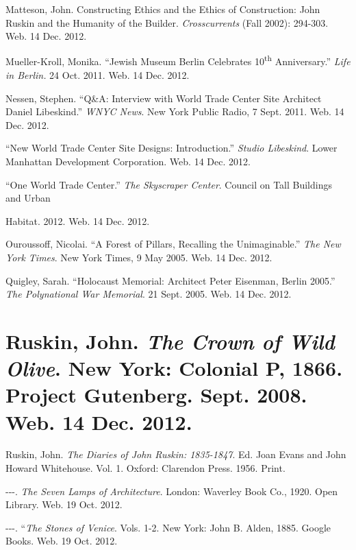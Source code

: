 {\color{black}
Matteson, John.  {\textquotedbl}Constructing Ethics and the Ethics of
Construction: John Ruskin and the Humanity of the
Builder.{\textquotedbl}  \textit{Crosscurrents} (Fall 2002): 294-303. 
Web.  14 Dec. 2012.}

{\color{black}
Mueller-Kroll, Monika.  “Jewish Museum Berlin Celebrates
10\textsuperscript{th} Anniversary.”  \textit{Life in Berlin.}  24 Oct.
2011.  Web.  14 Dec. 2012.  }

{\color{black}
Nessen, Stephen.  “Q\&A: Interview with World Trade Center Site
Architect Daniel Libeskind.”  \textit{WNYC News}.  New York Public
Radio, 7 Sept. 2011.  Web.  14 Dec. 2012.  }

{\color{black}
“New World Trade Center Site Designs: Introduction.”  \textit{Studio
Libeskind}.  Lower Manhattan Development Corporation.  Web.  14 Dec.
2012.  }

“One World Trade Center.”  \textit{The Skyscraper Center}.  Council on
Tall Buildings and Urban 

Habitat.  2012.  Web. 14 Dec. 2012.  

{\color{black}
Ouroussoff, Nicolai.  “A Forest of Pillars, Recalling the Unimaginable.”
 \textit{The New York Times}. New York Times, 9 May 2005.  Web.  14
Dec. 2012.}

{\color{black}
Quigley, Sarah.  “Holocaust Memorial: Architect Peter Eisenman, Berlin
2005.”  \textit{The Polynational War Memorial}.  21 Sept.  2005.  Web. 
14 Dec. 2012.  }

\section[Ruskin, John. \ The Crown of Wild Olive. \ New York: Colonial
P, 1866. \ Project Gutenberg. \ Sept. 2008. \ Web. \ 14 Dec. 2012.
]{\textmd{Ruskin, John.  }\textmd{\textit{The Crown of Wild
Olive}}\textmd{.  New York: Colonial P, 1866.  Project Gutenberg. 
Sept. 2008.  Web.  14 Dec. 2012. }}
{\color{black}
Ruskin, John.  \textit{The Diaries of John Ruskin: 1835-1847}.  Ed. 
Joan Evans and John Howard Whitehouse.  Vol. 1.  Oxford: Clarendon
Press.  1956.  Print.  }

{\color{black}
{}-{}-{}-.  \textit{The Seven Lamps of Architecture}.  London: Waverley
Book Co., 1920.  Open Library.  Web.  19 Oct. 2012.  }

{\color{black}
{}-{}-{}-.  “\textit{The Stones of Venice}.  Vols. 1-2.  New York: John
B. Alden, 1885.  Google Books.  Web.  19 Oct. 2012.  }

